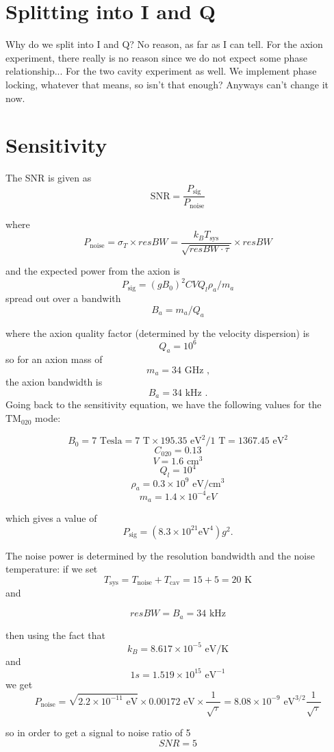 \documentclass[11pt]{article}
\begin{document}
\section{Splitting into I and Q}

Why do we split into I and Q? No reason, as far as I can tell. For the axion experiment, there really is no reason since we do not expect some phase relationship...
For the two cavity experiment as well. We implement phase locking, whatever that means, so isn't that enough?
Anyways can't change it now.

\section{Sensitivity}
The SNR is given as
$$\text{SNR} = \frac{P_{\text{sig}}}{P_{\text{noise}}}$$

where $$P_{\text{noise}} = \sigma_T\times resBW = \frac{k_B T_{\text{sys}}}{\sqrt{resBW \cdot \tau}}\times resBW$$

and the expected power from the axion is $$P_{\text{sig}}=(gB_0)^2 C V Q_l \rho_a/m_a$$
spread out over a bandwith $$B_a = m_a/Q_a$$

where the axion quality factor (determined  by the velocity dispersion) is $$Q_a = 10^6$$
so for an axion mass of $$m_a = 34\text{ GHz ,}$$
the axion bandwidth is
$$B_a = 34\text{ kHz .}$$
Going back to the sensitivity equation, we have the following values for the $\text{TM}_{020}$ mode:

$$B_0 = 7\text{ Tesla} = 7\text{ T}\times195.35\text{ eV}^2/1\text{ T} = 1367.45 \text{ eV}^2$$
$$C_{020} = 0.13$$
$$V = 1.6 \text{ cm}^3$$
$$Q_l = 10^4$$
$$\rho_a = 0.3\times10^9 \text{ eV}/\text{cm}^3$$
$$m_a = 1.4 \times 10^{-4} eV $$

which gives a value of $$P_{\text{sig}} = (8.3\times10^{21} \text{eV}^4) g^2.$$

The noise power is determined by the resolution bandwidth and the noise temperature: if we set
 $$T_{\text{sys}} = T_{\text{noise}} + T_{\text{cav}} = 15 + 5 = 20\text{ K}$$
and 

$$resBW = B_a = 34 \text{ kHz}$$

then using the fact that 
$$k_B = 8.617\times10^{-5}\text{ eV/K}$$ 
and 
$$1 s = 1.519 \times 10^{15} \text{ eV}^{-1}$$ 
we get
 $$P_{\text{noise}} =  \sqrt{2.2\times10^{-11}\text{ eV}} \times 0.00172 \text{ eV} \times \frac{1}{\sqrt{\tau}} = 8.08\times10^{-9}\text{ eV}^{3/2} \frac{1}{\sqrt{\tau}}$$

so in order to get a signal to noise ratio of 5 
$$SNR = 5$$
\end{document}
